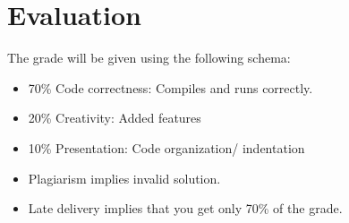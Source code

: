 \documentclass[a4paper]{article}
\begin{document}
	\section{Evaluation}
	The grade will be given using the following schema:
	\begin{itemize}
		\item 70\% Code correctness: Compiles and runs correctly.
		\item 20\% Creativity: Added features
		\item 10\% Presentation: Code organization/ indentation
	\end{itemize}
	\par \par
	\begin{itemize}
		\item Plagiarism implies invalid solution.
		\item Late delivery implies that you get only 70\% of the grade.
	\end{itemize}
\end{document}
